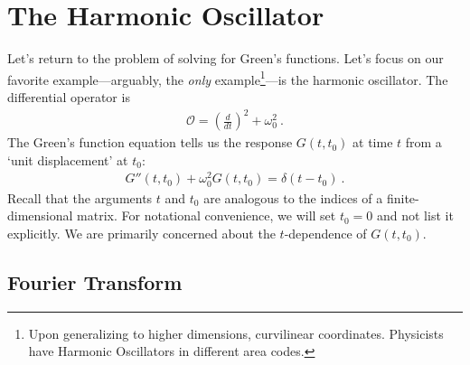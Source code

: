 
\section{The Harmonic Oscillator}

Let's return to the problem of solving for Green's functions. Let's focus on our favorite example---arguably, the \emph{only} example\footnote{Upon generalizing to higher dimensions, curvilinear coordinates. Physicists have Harmonic Oscillators in different area codes.}---is the harmonic oscillator. The differential operator is
\begin{align}
	\mathcal O = \left(\frac{d}{dt}\right)^2 + \omega_0^2 \ .
\end{align}
The Green's function equation tells us the response $G(t,t_0)$ at time $t$ from a `unit displacement' at $t_0$:
\begin{align}
	G''(t,t_0) + \omega_0^2 G(t,t_0) = \delta(t-t_0) \ .
	\label{eq:HO:Greens:eqn}
\end{align}
Recall that the arguments $t$ and $t_0$ are analogous to the indices of a finite-dimensional matrix. For notational convenience, we will set $t_0=0$ and not list it explicitly. We are primarily concerned about the $t$-dependence of $G(t,t_0)$. 

\subsection{Fourier Transform}

